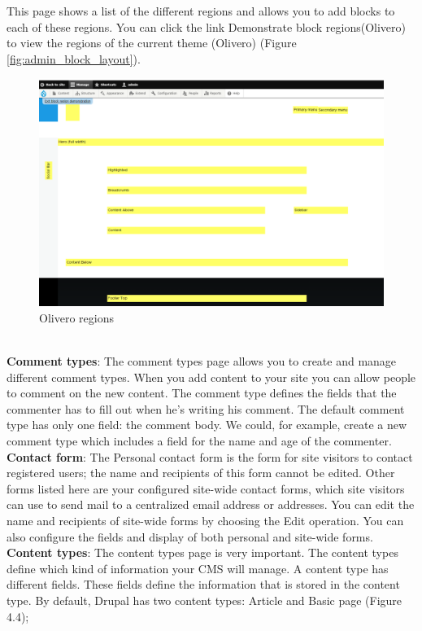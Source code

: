 This page shows a list of the different regions and allows you to add blocks to each of these regions. You can click the link Demonstrate block regions(Olivero) to view the regions of the current theme (Olivero) (Figure \ref{fig:admin_block_layout}).

\begin{figure}[h]
    \centering
    \includegraphics[width=1\linewidth]{img/ch4/admin_region_demo}
    \caption{Olivero regions}
    \label{fig:admin_region_demo}
\end{figure}

\\
\textbf{Comment types}: The comment types page allows you to create and manage different comment types. When you add content to your site you can allow people to comment on the new content. The comment type defines the fields that the commenter has to fill out when he’s writing his comment. The default comment type has only one field: the comment body. We could, for example, create a new comment type which includes a field for the name and age of the commenter.
\\
\textbf{Contact form}: The Personal contact form is the form for site visitors to contact registered users; the name and recipients of this form cannot be edited. Other forms listed here are your configured site-wide contact forms, which site visitors can use to send mail to a centralized email address or addresses. You can edit the name and recipients of site-wide forms by choosing the Edit operation. You can also configure the fields and display of both personal and site-wide forms.
\\
\textbf{Content types}: The content types page is very important. The content types define which kind of information your CMS will manage. A content type has different fields. These fields define the information that is stored in the content type. By default, Drupal has two content types: Article and Basic page (Figure 4.4);

